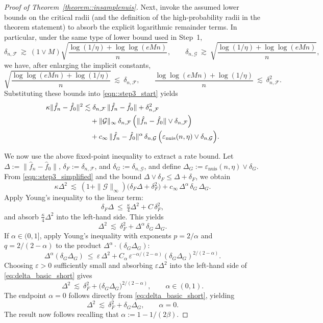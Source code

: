 \documentclass[11pt]{article}
\theoremstyle{plain}
\theoremstyle{definition} %
\begin{document}
\begin{proof}[Proof of Theorem~\ref{theorem::insamplenuis}]
Next, invoke the assumed lower bounds on the critical radii (and the definition of the high-probability radii in the theorem statement) to absorb the explicit logarithmic remainder terms. In particular, under the same type of lower bound used in Step~1,
\[
\delta_{n,\mathcal F}
\ \gtrsim\
(1 \vee M)\sqrt{\frac{\log(1/\eta)+\log\log(eMn)}{n}},
\qquad
\delta_{n,\mathcal G}
\ \gtrsim\
\sqrt{\frac{\log(1/\eta)+\log\log(eMn)}{n}},
\]
we have, after enlarging the implicit constants,
\[
\sqrt{\frac{\log\log(eMn)+\log(1/\eta)}{n}}
\ \lesssim\
\delta_{n,\mathcal F},
\qquad
\frac{\log\log(eMn)+\log(1/\eta)}{n}
\ \lesssim\
\delta_{n,\mathcal F}^2.
\]
Substituting these bounds into \eqref{eqn::step3_start} yields
\begin{align}
\label{eqn::step3_simplified}
\kappa\|\hat f_n-\hat f_0\|^2
&\lesssim
\delta_{n,\mathcal F}\,\|\hat f_n-\hat f_0\|
+\delta_{n,\mathcal F}^2
\nonumber\\
&\quad+
\|\mathcal G\|_\infty\,
\delta_{n,\mathcal F}\,
\Bigl(\|\hat f_n-\hat f_0\|\vee \delta_{n,\mathcal F}\Bigr)
\nonumber\\
&\quad+
c_\infty\,
\|\hat f_n-\hat f_0\|^{\alpha}\,
\delta_{n,\mathcal G}\,
\Bigl(\varepsilon_{\mathrm{nuis}}(n,\eta)\vee \delta_{n,\mathcal G}\Bigr).
\end{align}

We now use the above fixed-point inequality to extract a rate bound. Let $\Delta:=\|\hat f_n-\hat f_0\|$, $\delta_F:=\delta_{n,\mathcal F}$, and $\delta_G:=\delta_{n,\mathcal G}$, and define $\Delta_G:=\varepsilon_{\mathrm{nuis}}(n,\eta)\vee \delta_G$.
From \eqref{eqn::step3_simplified} and the bound $\Delta\vee \delta_F\le \Delta+\delta_F$, we obtain
\[
\kappa \Delta^2
\ \lesssim\
(1+\|\mathcal G\|_\infty)\bigl(\delta_F\Delta+\delta_F^2\bigr)
+c_\infty\,\Delta^\alpha\,\delta_G\,\Delta_G.
\]
Apply Young's inequality to the linear term:
\[
\delta_F\Delta \ \le\ \tfrac{\kappa}{4}\Delta^2 + C\,\delta_F^2,
\]
and absorb $\tfrac{\kappa}{4}\Delta^2$ into the left-hand side. This yields
\begin{equation}
\label{eq:delta_basic_short}
\Delta^2 \ \lesssim\ \delta_F^2 + \Delta^\alpha\,\delta_G\,\Delta_G .
\end{equation}
If $\alpha\in(0,1]$, apply Young's inequality with exponents $p=2/\alpha$ and $q=2/(2-\alpha)$ to the product $\Delta^\alpha\cdot(\delta_G\Delta_G)$:
\[
\Delta^\alpha(\delta_G\Delta_G)
\ \le\
\varepsilon\,\Delta^2
+ C_\alpha\,\varepsilon^{-\alpha/(2-\alpha)}(\delta_G\Delta_G)^{2/(2-\alpha)}.
\]
Choosing $\varepsilon>0$ sufficiently small and absorbing $\varepsilon\Delta^2$ into the left-hand side of \eqref{eq:delta_basic_short} gives
\[
\Delta^2
\ \lesssim\
\delta_F^2
+\bigl(\delta_G\Delta_G\bigr)^{2/(2-\alpha)},
\qquad \alpha\in(0,1).
\]
The endpoint $\alpha=0$ follows directly from \eqref{eq:delta_basic_short}, yielding
\[
\Delta^2\ \lesssim\ \delta_F^2+\delta_G\Delta_G,
\qquad \alpha=0.
\]
The result now follows recalling that $\alpha := 1 - 1/(2\beta)$.

 

\end{proof}

 
\end{document}
